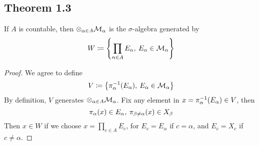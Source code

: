 \documentclass[../../main.tex]{subfiles}
\begin{document}
\subsection{Theorem 1.3}
\begin{wts}
    If $A$ is countable, then $\otimes_{\alpha\in A}\cal{M}_\alpha$ is the $\sigma$-algebra generated by 
    \[
    W\defined\left\{\prod_{\alpha\in A} E_\alpha,\: E_\alpha\in\cal{M}_\alpha\right\}
    \]
\end{wts}
\begin{proof}
We agree to define 
\[
V\defined\left\{\pnv{\alpha}{E_\alpha},\:E_\alpha\in\cal{M}_\alpha\right\}
\]
By definition, $V$ generates $\otimes_{\alpha\in A}\cal{M}_\alpha$. Fix any element in $x=\pnv{\alpha}{E_\alpha}\in V$, then 
\[
\pmap{\alpha}{x}\in E_\alpha,\:\pmap{\beta\neq\alpha}{x}\in X_\beta
\]
Then $x\in W$ if we choose $x = \prod_{c\in A}E_c$, for $E_c = E_\alpha$ if $c=\alpha$, and $E_c=X_c$ if $c\neq\alpha$.
\end{proof}
\end{document}
